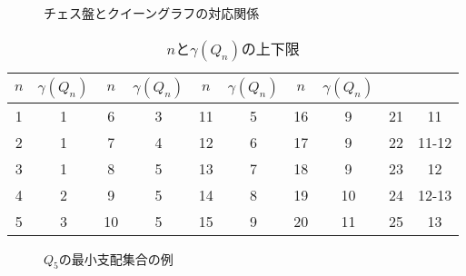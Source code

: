 \begin{figure}[htb]
  \label{ex:queengraph_3}
 \begin{minipage}[b]{0.35\linewidth}
  \centering
  
 \end{minipage} 
 \begin{minipage}[b]{0.2\linewidth}
  \centering
  
 \end{minipage}
 \begin{minipage}[b]{0.35\linewidth}
  \centering
  
 \end{minipage}
 \caption{チェス盤とクイーングラフの対応関係}
\end{figure}

\begin{table}[hbtp]
   \centering
   \caption{$n$と$\gamma(Q_n)$の上下限}
   \begin{tabular}{c|c||c|c||c|c||c|c||c|c} \hline
    $n$ & $\gamma(Q_{n})$ & $n$ & $\gamma(Q_{n})$ &$n$ & $\gamma(Q_{n})$ &$n$ & $\gamma(Q_{n})$ \\ \hline \hline
    1 &1 &6 &3 &11 &5 &16 &9 &21 &11\\ \hline
    2 &1 &7 &4 &12 &6 &17 &9 &22 &11-12\\ \hline
    3 &1 &8 &5 &13 &7 &18 &9 &23 &12\\ \hline
    4 &2 &9 &5 &14 &8 &19 &10 &24 &12-13\\ \hline
    5 &3 &10 &5 &15 &9 &20 &11 &25 &13\\ \hline
   \end{tabular}
   \label{tb:queen_n}
  \end{table}


\begin{figure}[htb]
  \centering
  
  \caption{$Q_5$の最小支配集合の例}
  \label{ex:queengraph5}
\end{figure}


